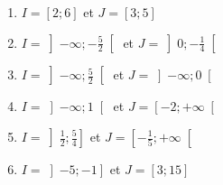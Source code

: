 \documentclass[
	landscape,
	twocolumn,
	classe=$2^{de}$,
	exercices=Activité\space Chapitre\space 2
]{exercice}
\newcommand{\intervalle}[4]{\left#1 #2;#3\right#4}
\begin{document}
{\begin{enumerate}
		      \begin{multicols}{2}
			      \begin{enumerate}
				      \item $I = \intervalle{[}{2}{6}{]}$ et $J = \intervalle{[}{3}{5}{]}$
				            \vspace{\itemSpacing}
				      \item $I =  \intervalle{]}{-∞}{-\frac{5}{2}}{[}$ et $J = \intervalle{]}{0}{-\frac{1}{4}}{[}$
				            \vspace{\itemSpacing}
				      \item $I =  \intervalle{]}{-∞}{\frac{5}{2}}{[}$ et $J = \intervalle{]}{-∞}{0}{[}$
				            \vspace{\itemSpacing}
				      \item $I =  \intervalle{]}{-∞}{1}{[}$ et $J = \intervalle{[}{-2}{+∞}{[}$
				            \vspace{\itemSpacing}
				      \item $I =  \intervalle{]}{\frac{1}{2}}{\frac{5}{4}}{]}$ et $J = \intervalle{[}{-\frac{1}{5}}{+∞}{[}$
				      \item $I =  \intervalle{]}{-5}{-1}{]}$ et $J = \intervalle{[}{3}{15}{]}$
			      \end{enumerate}
		      \end{multicols}
	\end{enumerate}
}

\Activite

\newpage
\Activite
\end{document}
